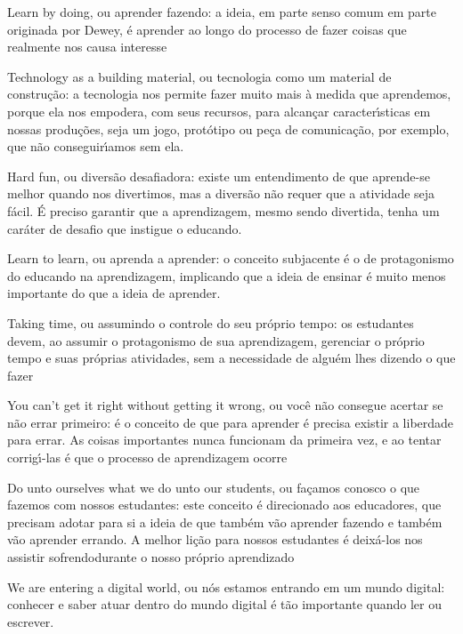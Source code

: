 \documentclass[
12pt,		%
openright,	%
twoside,  %
a4paper,			%
chapter=TITLE,		%
english,			%
french,				%
spanish,			%
brazil				%
]{USPSC-classe/USPSC}
\begin{document}
\begin{alineas}
\item Learn by doing, ou aprender fazendo: a ideia, em parte senso comum em parte originada por Dewey, \'e aprender ao longo do processo de fazer coisas que realmente nos causa interesse
\item Technology as a building material, ou \textquotedbl tecnologia como um material de constru\c{c}\~ao\textquotedbl : a tecnologia nos permite fazer muito mais \`a medida que aprendemos, porque ela nos empodera, com seus recursos, para alcan\c{c}ar caracter\'{\i}sticas em nossas produ\c{c}\~oes, seja um jogo, prot\'otipo ou pe\c{c}a de comunica\c{c}\~ao, por exemplo, que n\~ao conseguir\'{\i}amos sem ela.
\item Hard fun, ou \textquotedbl divers\~ao desafiadora\textquotedbl : existe um entendimento de que aprende-se melhor quando nos divertimos, mas a divers\~ao n\~ao requer que a atividade seja f\'acil. \'E preciso garantir que a aprendizagem, mesmo sendo divertida, tenha um car\'ater de desafio que instigue o educando.
\item Learn to learn, ou \textquotedbl aprenda a aprender\textquotedbl : o conceito subjacente \'e o de protagonismo do educando na aprendizagem, implicando que a ideia de ensinar \'e muito menos importante do que a ideia de aprender.
\item Taking time, ou \textquotedbl assumindo o controle do seu pr\'oprio tempo\textquotedbl : os estudantes devem, ao assumir o protagonismo de sua aprendizagem, gerenciar o pr\'oprio tempo e suas pr\'oprias atividades, sem a necessidade de algu\'em lhes dizendo o que fazer
\item You can't get it right without getting it wrong, ou \textquotedbl voc\^e n\~ao consegue acertar se n\~ao errar primeiro\textquotedbl : \'e o conceito de que para aprender \'e precisa existir a liberdade para errar. As coisas importantes nunca funcionam da primeira vez, e ao tentar corrig\'{\i}-las \'e que o processo de aprendizagem ocorre
\item Do unto ourselves what we do unto our students, ou \textquotedbl fa\c{c}amos conosco o que fazemos com nossos estudantes\textquotedbl : este conceito \'e direcionado aos educadores, que precisam adotar para si a ideia de que tamb\'em v\~ao aprender fazendo e tamb\'em v\~ao aprender errando. A melhor li\c{c}\~ao para nossos estudantes \'e deix\'a-los nos assistir \textquotedbl sofrendo\textquotedbl  durante o nosso pr\'oprio aprendizado
\item We are entering a digital world, ou \textquotedbl n\'os estamos entrando em um mundo digital\textquotedbl : conhecer e saber atuar dentro do mundo digital \'e t\~ao importante quando ler ou escrever.
\end{alineas}
\end{document}
